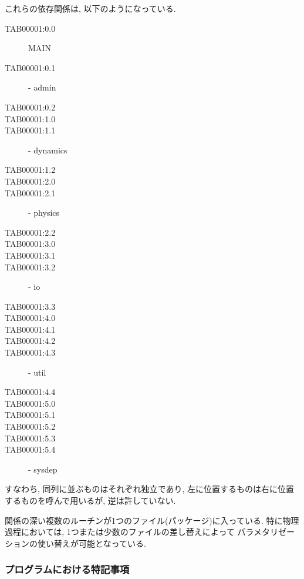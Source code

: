 これらの依存関係は, 以下のようになっている. 
\begin{center}
\begin{description}
\item[TAB00001:0.0] MAIN
\item[TAB00001:0.1] - admin
\item[TAB00001:0.2] 
\item[TAB00001:1.0] 
\item[TAB00001:1.1] - dynamics
\item[TAB00001:1.2] 
\item[TAB00001:2.0] 
\item[TAB00001:2.1] - physics
\item[TAB00001:2.2] 
\item[TAB00001:3.0] 
\item[TAB00001:3.1] 
\item[TAB00001:3.2] - io
\item[TAB00001:3.3] 
\item[TAB00001:4.0] 
\item[TAB00001:4.1] 
\item[TAB00001:4.2] 
\item[TAB00001:4.3] - util
\item[TAB00001:4.4] 
\item[TAB00001:5.0] 
\item[TAB00001:5.1] 
\item[TAB00001:5.2] 
\item[TAB00001:5.3] 
\item[TAB00001:5.4] - sysdep
\end{description}
\end{center}
すなわち, 同列に並ぶものはそれぞれ独立であり,
左に位置するものは右に位置するものを呼んで用いるが, 逆は許していない.

関係の深い複数のルーチンが1つのファイル(パッケージ)に入っている.
特に物理過程においては, 1つまたは少数のファイルの差し替えによって
パラメタリゼーションの使い替えが可能となっている.

\subsubsection{プログラムにおける特記事項}

